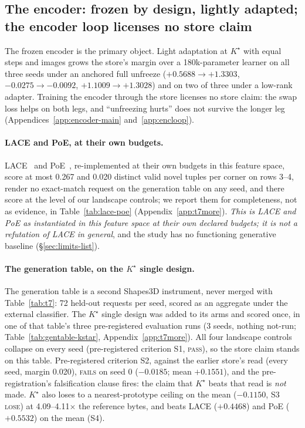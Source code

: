 \documentclass{article} %
\newcommand{\Kstar}{\ensuremath{K^{\star}}}
\begin{document}
\subsection{The encoder: frozen by design, lightly adapted; the encoder loop licenses no store claim}
\label{sec:adapt}\label{sec:bard}
The frozen encoder is the primary object. Light adaptation at $\Kstar$ with equal steps and
images grows the store's margin over a 180k-parameter learner on all three seeds under an
anchored full unfreeze ($+0.5688\to+1.3303$, $-0.0275\to-0.0092$, $+1.1009\to+1.3028$) and on two
of three under a low-rank adapter. %
Training the encoder through the store licenses no store claim: the swap loss helps on both legs,
and ``unfreezing hurts'' does not survive the longer leg (Appendices~\ref{app:encoder-main}
and~\ref{app:encloop}).

\paragraph{LACE and PoE, at their own budgets.}
LACE~\citep{nie2021controllable} and PoE~\citep{hinton2002training}, re-implemented at their own
budgets in this feature space, score at most 0.267 and 0.020 distinct valid novel tuples per corner %
on rows 3--4, render no exact-match request on the generation table on any seed, and there score at
the level of our landscape controls; we report them for completeness, not as evidence, in
Table~\ref{tab:lace-poe} (Appendix~\ref{app:t7more}). \emph{This is LACE and PoE as instantiated in
this feature space at their own declared budgets; it is not a refutation of LACE in general}, and
the study has no functioning generative baseline (\S\ref{sec:limits-list}).

\paragraph{The generation table, on the $\Kstar$ single design.}
The generation table is a second Shapes3D instrument, never merged with Table~\ref{tab:t7}: 72 %
held-out requests per seed, scored as an aggregate under the external classifier. The $\Kstar$ single design was added
to its arms and scored once, in one of that table's three pre-registered evaluation runs (3 seeds,
nothing not-run; Table~\ref{tab:gentable-kstar}, %
Appendix~\ref{app:t7more}). All four landscape controls collapse on every seed (pre-registered criterion S1, %
\textsc{pass}), so the store claim stands on this table. Pre-registered criterion S2, against the earlier
store's read (every seed, margin 0.020), \textsc{fails} on seed 0 ($-0.0185$; mean $+0.1551$), and the %
pre-registration's falsification clause fires: the claim that $\Kstar$ beats that read is
\emph{not} made. $\Kstar$ also loses to a nearest-prototype ceiling on the mean %
($-0.1150$, S3 \textsc{lose}) at 4.09--4.11$\times$ the reference bytes, and beats LACE %
($+0.4468$) and PoE ($+0.5532$) on the mean (S4). %
\end{document}
